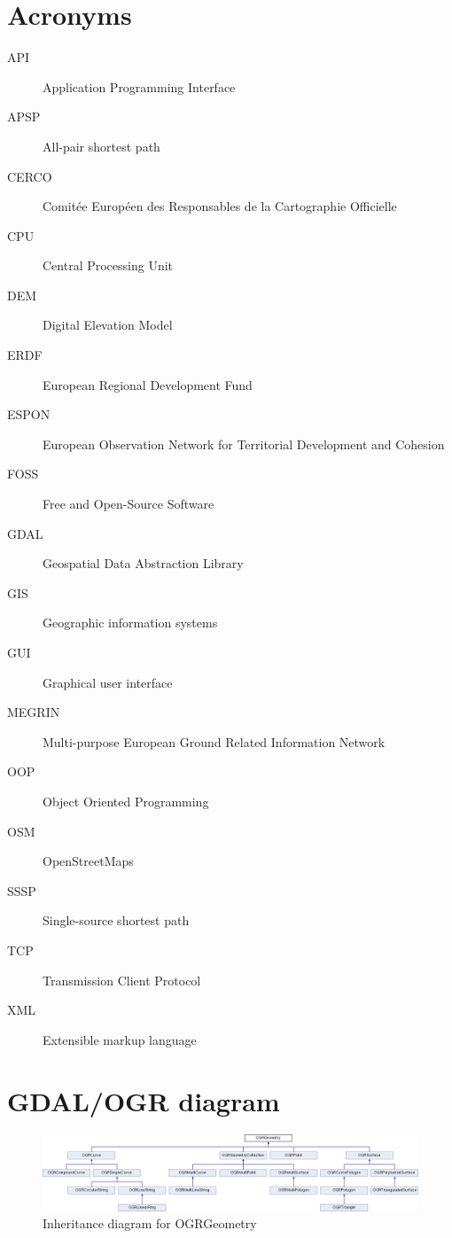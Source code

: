 \documentclass[thesis=M,english]{FITthesis}[2012/10/20]
\begin{document}
\chapter{Acronyms}
\begin{description}
	\item[API] Application Programming Interface
	\item[APSP] All-pair shortest path
	\item[CERCO] Comit{\' e}e Europ{\' e}en des Responsables de la Cartographie Officielle
	\item[CPU] Central Processing Unit
	\item[DEM] Digital Elevation Model
	\item[ERDF] European Regional Development Fund
	\item[ESPON] European Observation Network for Territorial Development and Cohesion
	\item[FOSS] Free and Open-Source Software
	\item[GDAL] Geospatial Data Abstraction Library
	\item[GIS] Geographic information systems	
	\item[GUI] Graphical user interface
	\item[MEGRIN] Multi-purpose European Ground Related Information Network
	\item[OOP] Object Oriented Programming
	\item[OSM] OpenStreetMaps
	\item[SSSP] Single-source shortest path
	\item[TCP] Transmission Client Protocol
	\item[XML] Extensible markup language
	
	
\end{description}

\chapter{GDAL/OGR diagram}


\begin{figure}[H]
\centering
\includegraphics[width=1\textwidth]{pics/classOGRGeometry}
\caption{Inheritance diagram for OGRGeometry}
\label{pic:OGRGeo}
\end{figure}
\end{document}
